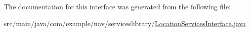 The documentation for this interface was generated from the following file\+:\begin{DoxyCompactItemize}
\item 
src/main/java/com/example/nav/serviceslibrary/\hyperlink{_location_services_interface_8java}{Location\+Services\+Interface.\+java}\end{DoxyCompactItemize}
